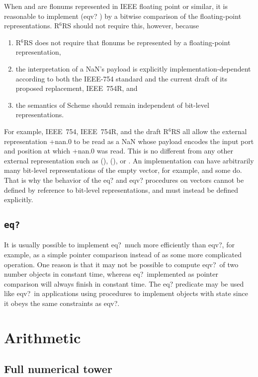 \documentclass[twoside,twocolumn]{algol60}
\newcommand{\rn}[1]{R$^{#1}$RS}
\begin{document}
When  and  are flonums represented in IEEE floating
point or similar, it is reasonable to implement {\cf (eqv? 
  )} by a bitwise comparison of the floating-point
representations.  \rn{6} should not require this, however, because
%
\begin{enumerate}
\item \rn{6} does not require that flonums be represented by a
  floating-point representation,
\item the interpretation of a NaN's payload is explicitly
  implementation-dependent according to both the IEEE-754 standard and
  the current draft of its proposed replacement, IEEE~754R, and
\item the semantics of Scheme should remain independent
  of bit-level representations.
\end{enumerate}
%
For example, IEEE~754, IEEE~754R, and the draft \rn{6} all allow the
external representation {\cf +nan.0} to be read as a NaN whose payload
encodes the input port and position at which {\cf +nan.0} was read.
This is no different from any other external representation such as
{\cf ()}, {\cf \sharpsign()}, or {}.  An implementation can
have arbitrarily many bit-level representations of the empty vector,
for example, and some do.  That is why the behavior of the {\cf eq?}
and {\cf eqv?} procedures on vectors cannot be defined by reference to
bit-level representations, and must instead be defined explicitly.

\subsection{{\tt eq?}}

It is usually possible to implement {\cf eq?}\ much more efficiently
than {\cf eqv?}, for example, as a simple pointer comparison instead
of as some more complicated operation.  One reason is that it may not
be possible to compute {\cf eqv?}\ of two number objects in constant time,
whereas {\cf eq?}\ implemented as pointer comparison will always
finish in constant time.  The {\cf eq?} predicate may be used like
{\cf eqv?}\ in applications using procedures to implement objects with
state since it obeys the same constraints as {\cf eqv?}.

\section{Arithmetic}

\subsection{Full numerical tower}
\end{document}
